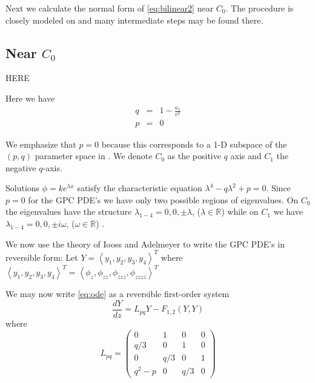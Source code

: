 Next we calculate the normal form of \eqref{eq:bilinear2} near $C_0$. The procedure is
closely modeled on \cite{IA} and many intermediate steps may be found there. 


\subsection{ Near $C_0$ }
HERE

Here we have
\begin{subequations}
\begin{eqnarray}
q &=& 1 - \frac{a_1}{c^2} \\
p &=& 0 
\end{eqnarray}
\end{subequations}

We emphasize that $p=0$ because this corresponds to a 1-D subspace of the $(p,q)$ parameter space in \cite{Roy1}. We denote $C_0$ as the positive $q$ axis and $C_1$ the negative $q$-axis. 

Solutions $\phi = k e^{\lambda x}$ satisfy the characteristic equation $\lambda^4 - q \lambda^2 + p = 0 $. Since $p=0$ for the GPC PDE's we have only two possible regions of eigenvalues. On $C_0$ the eigenvalues have the structure 
$\lambda_{1-4} = 0,0,\pm \lambda$, ($\lambda \in \mathbb{R}$) while on $C_1$ we have 
$\lambda_{1-4} = 0,0,\pm i \omega $, ($\omega \in \mathbb{R} $) .



We now use the theory of Iooss and Adelmeyer \cite{IA} to write the GPC PDE's in reversible form:
Let $Y=\left<y_1,y_2,y_3,y_4\right>^T$ where $\left<y_1,y_2,y_3,y_4\right>^T = \left<\phi_z,\phi_{zz}, \phi_{zzz}, \phi_{zzzz} \right>^T $

We may now write \eqref{eq:ode} as a reversible first-order system 
\begin{equation}\frac{ dY }{ dz } = L_{pq} Y - F_{1,2}(Y,Y) \end{equation}
 where
\begin{equation}
L_{pq} = \left( 
\begin{array}{cccc}
0&1&0&0\\
q/3&0&1&0\\
0&q/3&0&1\\
q^2 - p &0&q/3&0 \end{array} \right) \end{equation}

